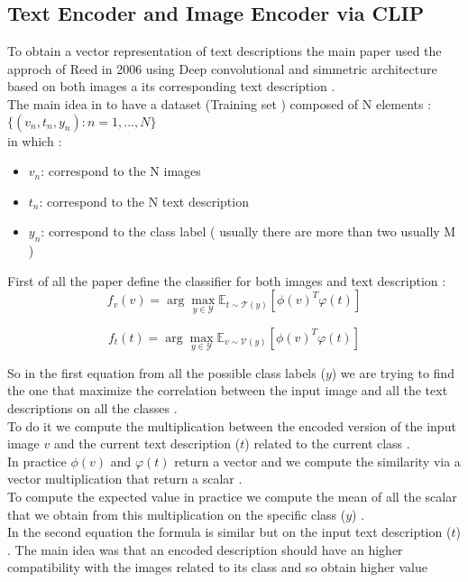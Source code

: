 \subsection*{
    Text Encoder and Image Encoder via CLIP
}
To obtain a vector representation of text descriptions the main paper used the approch 
of Reed in 2006 using Deep convolutional and simmetric architecture based on both 
images a its corresponding text description . \\
The main idea in to have a dataset (Training set ) composed of N elements : 
\\
$ \{(v_n, t_n, y_n) : n = 1, ..., N\} $
\\
in which :
\begin{itemize}
    \item $ v_n $: correspond to the N images
    \item $ t_n $: correspond to the N text description
    \item $ y_n $: correspond to the class label ( usually there are more than two usually M )
\end{itemize}

First of all the paper define the classifier for both images and text description :
\begin{equation}
    f_v(v) = \arg \max_{y \in \mathcal{Y}} \mathbb{E}_{t \sim \mathcal{T}(y)} [\phi(v)^T \varphi(t)]
\end{equation}
    
\begin{equation}
    f_t(t) = \arg \max_{y \in \mathcal{Y}} \mathbb{E}_{v \sim \mathcal{V}(y)} [\phi(v)^T \varphi(t)]
\end{equation}

So in the first equation from all the possible class labels ($y$) we are trying to find the one that maximize the correlation between 
the input image and all the text descriptions on all the classes . \\
To do it we compute the multiplication between the encoded version of the input image $v$ and the current text description ($t$)
related to the current class . \\
In practice $\phi(v)$ and $\varphi(t )$ return a vector and we compute the similarity via a vector multiplication that return a scalar .\\ 
To compute the expected value in practice we compute the mean of all the scalar that we obtain from 
this multiplication on the specific class ($y$) .\\
In the second equation the formula is similar but on the input text description ($t$) .
The main idea was that an encoded description should have an higher compatibility 
with the images related to its class and so obtain higher value 

